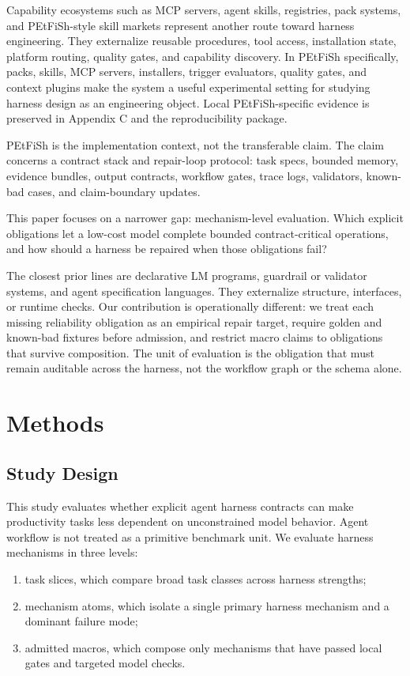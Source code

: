 \documentclass[11pt]{article}
\begin{document}
Capability ecosystems such as MCP servers, agent skills, registries, pack systems, and PEtFiSh-style skill markets represent another route toward harness engineering. They externalize reusable procedures, tool access, installation state, platform routing, quality gates, and capability discovery. In PEtFiSh specifically, packs, skills, MCP servers, installers, trigger evaluators, quality gates, and context plugins make the system a useful experimental setting for studying harness design as an engineering object. Local PEtFiSh-specific evidence is preserved in Appendix C and the reproducibility package.

PEtFiSh is the implementation context, not the transferable claim. The claim concerns a contract stack and repair-loop protocol: task specs, bounded memory, evidence bundles, output contracts, workflow gates, trace logs, validators, known-bad cases, and claim-boundary updates.

This paper focuses on a narrower gap: mechanism-level evaluation. Which explicit obligations let a low-cost model complete bounded contract-critical operations, and how should a harness be repaired when those obligations fail?

The closest prior lines are declarative LM programs, guardrail or validator systems, and agent specification languages. They externalize structure, interfaces, or runtime checks. Our contribution is operationally different: we treat each missing reliability obligation as an empirical repair target, require golden and known-bad fixtures before admission, and restrict macro claims to obligations that survive composition. The unit of evaluation is the obligation that must remain auditable across the harness, not the workflow graph or the schema alone.

\section{Methods}

\subsection{Study Design}

This study evaluates whether explicit agent harness contracts can make productivity tasks less dependent on unconstrained model behavior. Agent workflow is not treated as a primitive benchmark unit. We evaluate harness mechanisms in three levels:

\begin{enumerate}
\item task slices, which compare broad task classes across harness strengths;
\item mechanism atoms, which isolate a single primary harness mechanism and a dominant failure mode;
\item admitted macros, which compose only mechanisms that have passed local gates and targeted model checks.
\end{enumerate}
\end{document}

